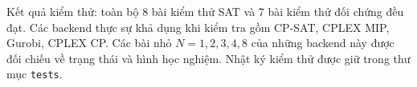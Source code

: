 Kết quả kiểm thử: toàn bộ 8 bài kiểm thử SAT và 7 bài kiểm thử đối chứng đều đạt. Các backend thực sự khả dụng khi kiểm tra gồm CP-SAT, CPLEX MIP, Gurobi, CPLEX CP. Các bài nhỏ $N=1,2,3,4,8$ của những backend này được đối chiếu về trạng thái và hình học nghiệm. Nhật ký kiểm thử được giữ trong thư mục \texttt{tests}.
